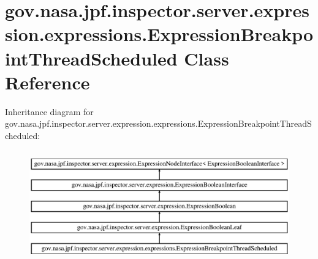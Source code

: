 \hypertarget{classgov_1_1nasa_1_1jpf_1_1inspector_1_1server_1_1expression_1_1expressions_1_1_expression_breakpoint_thread_scheduled}{}\section{gov.\+nasa.\+jpf.\+inspector.\+server.\+expression.\+expressions.\+Expression\+Breakpoint\+Thread\+Scheduled Class Reference}
\label{classgov_1_1nasa_1_1jpf_1_1inspector_1_1server_1_1expression_1_1expressions_1_1_expression_breakpoint_thread_scheduled}
Inheritance diagram for gov.\+nasa.\+jpf.\+inspector.\+server.\+expression.\+expressions.\+Expression\+Breakpoint\+Thread\+Scheduled\+:\begin{figure}[H]
\begin{center}
\leavevmode
\includegraphics[height=4.827586cm]{classgov_1_1nasa_1_1jpf_1_1inspector_1_1server_1_1expression_1_1expressions_1_1_expression_breakpoint_thread_scheduled}
\end{center}
\end{figure}
